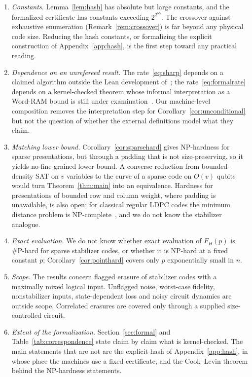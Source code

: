 \documentclass[11pt]{article}
\theoremstyle{remark}
\begin{document}
\begin{enumerate}
\item \emph{Constants.} Lemma~\ref{lem:hash} has absolute but large
 constants, and the formalized certificate has constants exceeding
 \(2^{2^{58}}\). The crossover against exhaustive enumeration
 (Remark~\ref{rem:crossover}) is far beyond any physical code size.
 Reducing the hash constants, or formalizing the explicit construction
 of Appendix~\ref{app:hash}, is the first step toward any practical
 reading.
\item \emph{Dependence on an unrefereed result.} The rate~\eqref{eq:sharp}
 depends on a claimed algorithm outside the Lean development
 of~\cite{openai2026eth}; the rate~\eqref{eq:formalrate} depends on a
 kernel-checked theorem whose informal interpretation as a Word-RAM
 bound is still under examination~\cite{ethdiscussion2026}. Our
 machine-level composition removes the interpretation step for
 Corollary~\ref{cor:unconditional} but not the question of whether the
 external definitions model what they claim.
\item \emph{Matching lower bound.} Corollary~\ref{cor:sparsehard} gives
 NP-hardness for sparse presentations, but through a padding that is
 not size-preserving, so it yields no fine-grained lower bound. A
 converse reduction from bounded-density SAT on \(v\) variables to the
 curve of a sparse code on \(O(v)\) qubits would turn
 Theorem~\ref{thm:main} into an equivalence. Hardness for presentations
 of bounded row and column weight, where padding is unavailable, is
 also open; for classical regular LDPC codes the minimum distance
 problem is NP-complete~\cite{jia2026ldpc}, and we do not know the
 stabilizer analogue.
\item \emph{Exact evaluation.} We do not know whether exact evaluation
 of \(F_H(p)\) is \#P-hard for sparse stabilizer codes, or whether it is
 NP-hard at a fixed constant \(p\); Corollary~\ref{cor:pointhard} covers
 only \(p\) exponentially small in \(n\).
\item \emph{Scope.} The results concern flagged erasure of stabilizer
 codes with a maximally mixed logical input. Unflagged noise,
 worst-case fidelity, nonstabilizer inputs, state-dependent loss and
 noisy circuit dynamics are outside scope. Correlated erasures are
 covered only through a supplied size-controlled circuit.
\item \emph{Extent of the formalization.} Section~\ref{sec:formal} and
 Table~\ref{tab:correspondence} state claim by claim what is
 kernel-checked. The main statements that are not are the explicit hash
 of Appendix~\ref{app:hash}, in whose place the machines use a fixed
 certificate, and the Cook--Levin theorem behind the NP-hardness
 statements.
\end{enumerate}
\end{document}
